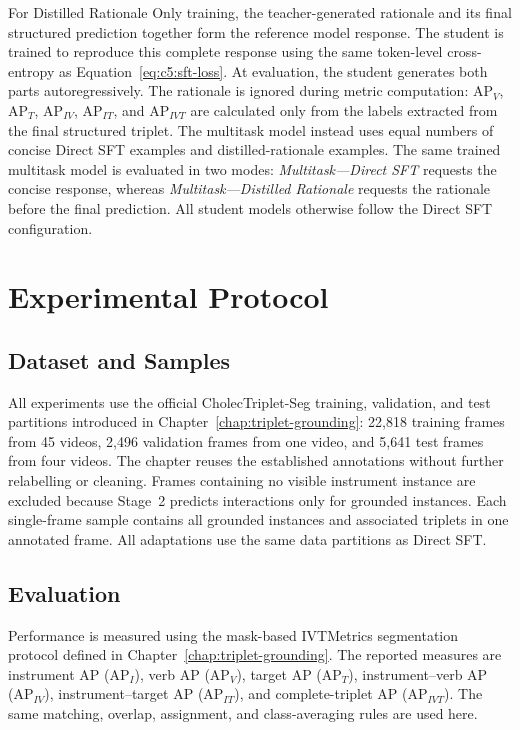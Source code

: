 For Distilled Rationale Only training, the teacher-generated rationale and its final structured prediction together form the reference model response. The student is trained to reproduce this complete response using the same token-level cross-entropy as Equation~\ref{eq:c5:sft-loss}. At evaluation, the student generates both parts autoregressively. The rationale is ignored during metric computation: AP$_V$, AP$_T$, AP$_{IV}$, AP$_{IT}$, and AP$_{IVT}$ are calculated only from the labels extracted from the final structured triplet. The multitask model instead uses equal numbers of concise Direct SFT examples and distilled-rationale examples. The same trained multitask model is evaluated in two modes: \emph{Multitask---Direct SFT} requests the concise response, whereas \emph{Multitask---Distilled Rationale} requests the rationale before the final prediction. All student models otherwise follow the Direct SFT configuration.

\begingroup
\cFiveSupplementfalse
\cFiveTrainingtrue
\cFiveErrorAnalysisfalse

\endgroup

\section{Experimental Protocol}
\label{sec:c5:experimental-protocol}

\subsection{Dataset and Samples}

All experiments use the official CholecTriplet-Seg training, validation, and test partitions introduced in Chapter~\ref{chap:triplet-grounding}: 22,818 training frames from 45 videos, 2,496 validation frames from one video, and 5,641 test frames from four videos. The chapter reuses the established annotations without further relabelling or cleaning. Frames containing no visible instrument instance are excluded because Stage~2 predicts interactions only for grounded instances. Each single-frame sample contains all grounded instances and associated triplets in one annotated frame. All adaptations use the same data partitions as Direct SFT.

\subsection{Evaluation}

Performance is measured using the mask-based IVTMetrics segmentation protocol defined in Chapter~\ref{chap:triplet-grounding}. The reported measures are instrument AP (AP$_I$), verb AP (AP$_V$), target AP (AP$_T$), instrument--verb AP (AP$_{IV}$), instrument--target AP (AP$_{IT}$), and complete-triplet AP (AP$_{IVT}$). The same matching, overlap, assignment, and class-averaging rules are used here.

